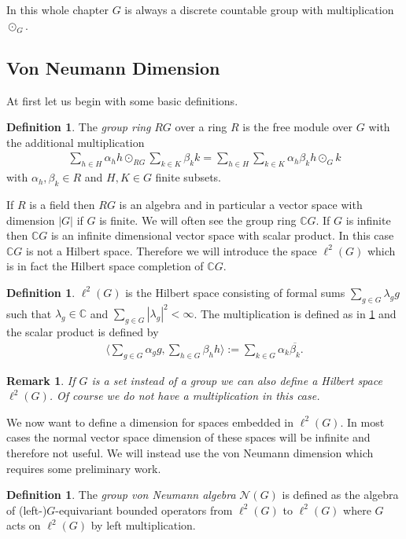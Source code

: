 \documentclass[12pt,a4paper]{scrartcl}
\theoremstyle{plain}
\newtheorem{Remark}[Theorem]{Remark}
\theoremstyle{definition}
\newtheorem{Definition}[Theorem]{Definition}
\newcommand{\C}{\mathbb{C}} %
\newcommand{\2}{\mathbb{Z} / 2 \mathbb{Z}}
\newcommand{\1}{\bar{1}}
\newcommand{\0}{\bar{0}}
\begin{document}
In this whole chapter $G$ is always a discrete countable group with multiplication $\odot_G$.
\subsection{Von Neumann Dimension} \label{fiss}
At first let us begin with some basic definitions.
\begin{Definition} \label{GR}
	The \emph{group ring} $RG$ over a ring $R$ is the free module over $G$ with the additional multiplication
	\begin{align*}
		\sum_{h \in H} \alpha_h h \odot_{RG} \sum_{k \in K} \beta_k k = \sum_{h \in H} \sum_{k \in K} \alpha_h \beta_k h \odot_G k
	\end{align*}
	with $\alpha_h, \beta_k \in R$ and $H, K \in G$ finite subsets.
\end{Definition}
If $R$ is a field then $RG$ is an algebra and in particular a vector space with dimension $|G|$ if $G$ is finite. We will often see the group ring $\C G$. If $G$ is infinite then $\C G$ is an infinite dimensional vector space with scalar product. In this case $\C G$ is not a Hilbert space. Therefore we will introduce the space $\ell^2(G)$ which is in fact the Hilbert space completion of $\C G$.
\begin{Definition}
	$\ell^2(G)$ is the Hilbert space consisting of formal sums $\sum_{g \in G} \lambda_g g$ such that $\lambda_g \in \C$ and $\sum_{g \in G} |\lambda_g|^2 < \infty$. The multiplication is defined as in \ref{GR} and the scalar product is defined by
	\begin{align*}
		\langle \sum_{g \in G} \alpha_g g, \sum_{h \in G} \beta_h  h \rangle := \sum_{k \in G} \alpha_k \overline{\beta_k}.
	\end{align*}
\end{Definition}
\begin{Remark}
	If $G$ is a set instead of a group we can also define a Hilbert space $\ell^2(G)$. Of course we do not have a multiplication in this case.
\end{Remark}
We now want to define a dimension for spaces embedded in $\ell^2(G)$. In most cases the normal vector space dimension of these spaces will be infinite and therefore not useful. We will instead use the von Neumann dimension which requires some preliminary work.
\begin{Definition}
	The \emph{group von Neumann algebra} $\mathcal{N}(G)$ is defined as the algebra of (left-)$G$-equivariant bounded operators from $\ell^2(G)$ to $\ell^2(G)$ where $G$ acts on $\ell^2(G)$ by left multiplication.
\end{Definition}
\end{document}

